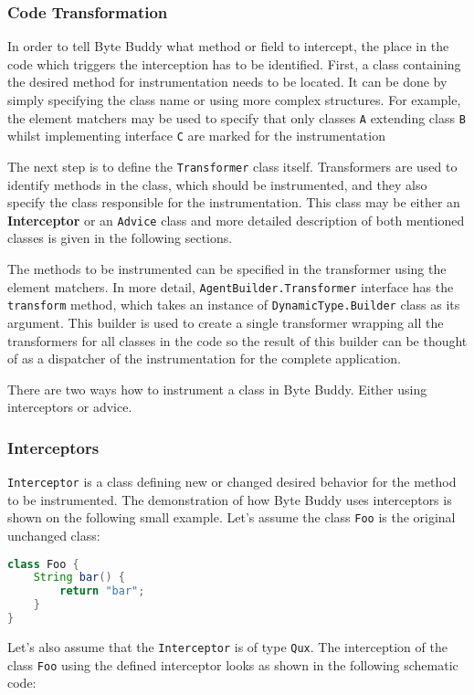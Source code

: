 \subsubsection{Code Transformation}
\label{back:code_transform}
In order to tell Byte Buddy what method or field to intercept, the place in the code which triggers the interception has to be identified. First, a class containing the desired method for instrumentation needs to be located. It can be done by simply specifying the class name or using more complex structures. For example, the element matchers may be used to specify that only classes \texttt{A} extending class \texttt{B} whilst implementing interface \texttt{C} are marked for the instrumentation

The next step is to define the \texttt{Transformer} class itself. Transformers are used to identify methods in the class, which should be instrumented, and they also specify the class responsible for the instrumentation. This class may be either an \textbf{Interceptor} or an \texttt{Advice} class and more detailed description of both mentioned classes is given in the following sections.

The methods to be instrumented can be specified in the transformer using the element matchers. In more detail, \texttt{AgentBuilder.Transformer} interface has the \texttt{transform} method, which takes an instance of \texttt{DynamicType.Builder} class as its argument. This builder is used to create a single transformer wrapping all the transformers for all classes in the code so the result of this builder can be thought of as a dispatcher of the instrumentation for the complete application.

There are two ways how to instrument a class in Byte Buddy. Either using interceptors or advice.
\subsubsection{Interceptors}
\texttt{Interceptor} is a class defining new or changed desired behavior for the method to be instrumented.  The demonstration of how Byte Buddy uses interceptors is shown on the following small example. Let's assume the class \texttt{Foo} is the original unchanged class:
\begin{lstlisting}[language=Java]
class Foo {
	String bar() {
		return "bar"; 
	}
}
\end{lstlisting}
	
Let's also assume that the \texttt{Interceptor} is of type \texttt{Qux}. The interception of the class \texttt{Foo} using the defined interceptor looks as shown in the following schematic code:


